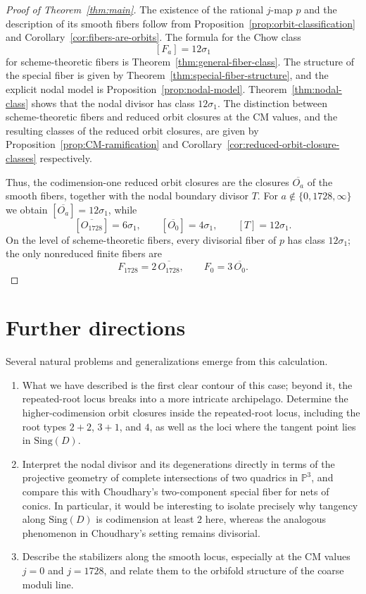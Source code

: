 \documentclass[11pt]{article}
\newcommand{\Pj}{\mathbb P}
\newcommand{\Sing}{\mathrm{Sing}}
\begin{document}
\begin{proof}[Proof of Theorem~\ref{thm:main}]
The existence of the rational $j$-map $p$ and the description of its smooth fibers follow from Proposition~\ref{prop:orbit-classification} and Corollary~\ref{cor:fibers-are-orbits}. The formula for the Chow class
\[
[F_a]=12\sigma_1
\]
for scheme-theoretic fibers is Theorem~\ref{thm:general-fiber-class}. The structure of the special fiber is given by Theorem~\ref{thm:special-fiber-structure}, and the explicit nodal model is Proposition~\ref{prop:nodal-model}. Theorem~\ref{thm:nodal-class} shows that the nodal divisor has class $12\sigma_1$. The distinction between scheme-theoretic fibers and reduced orbit closures at the CM values, and the resulting classes of the reduced orbit closures, are given by Proposition~\ref{prop:CM-ramification} and Corollary~\ref{cor:reduced-orbit-closure-classes} respectively. 

Thus, the codimension-one reduced orbit closures are the closures $\overline{O_a}$ of the smooth
fibers, together with the nodal boundary divisor $T$. For $a\notin\{0,1728,\infty\}$ we obtain
$[\overline{O_a}]=12\sigma_1$, while
\[
[\overline{O_{1728}}]=6\sigma_1,\qquad
[\overline{O_0}]=4\sigma_1,\qquad
[T]=12\sigma_1.
\]
On the level of scheme-theoretic fibers, every divisorial fiber of $p$ has class $12\sigma_1$;
the only nonreduced finite fibers are
\[
F_{1728}=2\,\overline{O_{1728}},\qquad F_0=3\,\overline{O_0}.
\]
\end{proof}

\section{Further directions}

Several natural problems and generalizations emerge from this calculation.
\begin{enumerate}[label=\textup{(\roman*)}]
    \item What we have described is the first clear contour of this case; beyond it, the repeated-root locus breaks into a more intricate archipelago. Determine the higher-codimension orbit closures inside the repeated-root locus, including the root types $2+2$, $3+1$, and $4$, as well as the loci where the tangent point lies in $\Sing(D)$.
    \item Interpret the nodal divisor and its degenerations directly in terms of the projective geometry of complete intersections of two quadrics in $\Pj^3$, and compare this with Choudhary's two-component special fiber for nets of conics. In particular, it would be interesting to isolate precisely why tangency along $\Sing(D)$ is codimension at least $2$ here, whereas the analogous phenomenon in Choudhary's setting remains divisorial.
    \item Describe the stabilizers along the smooth locus, especially at the CM values $j=0$ and $j=1728$, and relate them to the orbifold structure of the coarse moduli line.
\end{enumerate}
\end{document}

